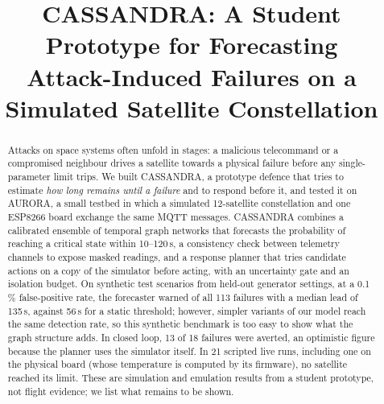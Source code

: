 \documentclass[conference]{IEEEtran}
\begin{document}
\title{CASSANDRA: A Student Prototype for Forecasting\\Attack-Induced Failures on a Simulated Satellite Constellation}

\author{
}

\maketitle

\begin{abstract}
Attacks on space systems often unfold in stages: a malicious telecommand or a compromised neighbour
drives a satellite towards a physical failure before any single-parameter limit trips. We built
CASSANDRA, a prototype defence that tries to estimate \emph{how long remains until a failure} and to
respond before it, and tested it on AURORA, a small testbed in which a simulated 12-satellite
constellation and one ESP8266 board exchange the same MQTT messages. CASSANDRA combines a calibrated
ensemble of temporal graph networks that forecasts the probability of reaching a critical state within
10--120\,s, a consistency check between telemetry channels to expose masked readings, and a response
planner that tries candidate actions on a copy of the simulator before acting, with an uncertainty gate
and an isolation budget. On synthetic test scenarios from held-out generator settings, at a 0.1\,\%
false-positive rate, the forecaster warned of all 113 failures with a median lead of 135\,s, against
56\,s for a static threshold; however, simpler variants of our model reach the same detection rate, so
this synthetic benchmark is too easy to show what the graph structure adds. In closed loop, 13 of 18
failures were averted, an optimistic figure because the planner uses the simulator itself. In 21 scripted
live runs, including one on the physical board (whose temperature is computed by its firmware), no
satellite reached its limit. These are simulation and emulation results from a student prototype, not
flight evidence; we list what remains to be shown.
\end{abstract}
\end{document}
